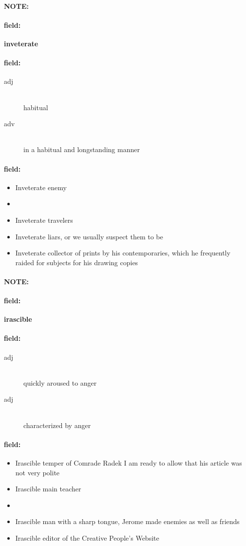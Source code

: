 \documentclass[12pt]{article}
\newenvironment{note}{\paragraph{NOTE:}}{}
\newenvironment{field}{\paragraph{field:}}{}
\begin{document}
\begin{note}
\begin{field}
\textbf{\large inveterate}
\end{field}


\begin{field}
\begin{description}
\item[adj] \hfill \\ 
habitual

\item[adv] \hfill \\ 
in a habitual and longstanding manner

\end{description}
\end{field}

\begin{field}
\begin{itemize}
\item Inveterate enemy
\item 
\item Inveterate travelers
\item Inveterate liars, or we usually suspect them to be
\item Inveterate collector of prints by his contemporaries, which he frequently raided for subjects for his drawing copies
\end{itemize}
\end{field}
\end{note}
\begin{note}
\begin{field}
\textbf{\large irascible}
\end{field}


\begin{field}
\begin{description}
\item[adj] \hfill \\ 
quickly aroused to anger

\item[adj] \hfill \\ 
characterized by anger

\end{description}
\end{field}

\begin{field}
\begin{itemize}
\item Irascible temper of Comrade Radek I am ready to allow that his article was not very polite
\item Irascible main teacher
\item 
\item Irascible man with a sharp tongue, Jerome made enemies as well as friends
\item Irascible editor of the Creative People's Website
\end{itemize}
\end{field}
\end{note}
\end{document}
